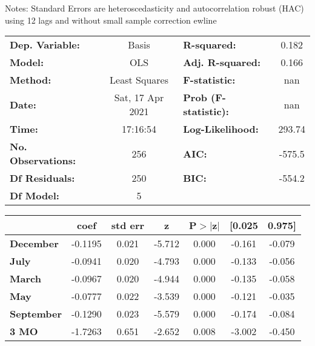 Notes: \newline
 [1] Standard Errors are heteroscedasticity and autocorrelation robust (HAC) using 12 lags and without small sample correction
ewline\begin{center}
\begin{tabular}{lclc}
\toprule
\textbf{Dep. Variable:}    &      Basis       & \textbf{  R-squared:         } &     0.182   \\
\textbf{Model:}            &       OLS        & \textbf{  Adj. R-squared:    } &     0.166   \\
\textbf{Method:}           &  Least Squares   & \textbf{  F-statistic:       } &       nan   \\
\textbf{Date:}             & Sat, 17 Apr 2021 & \textbf{  Prob (F-statistic):} &      nan    \\
\textbf{Time:}             &     17:16:54     & \textbf{  Log-Likelihood:    } &    293.74   \\
\textbf{No. Observations:} &         256      & \textbf{  AIC:               } &    -575.5   \\
\textbf{Df Residuals:}     &         250      & \textbf{  BIC:               } &    -554.2   \\
\textbf{Df Model:}         &           5      & \textbf{                     } &             \\
\bottomrule
\end{tabular}
\begin{tabular}{lcccccc}
                   & \textbf{coef} & \textbf{std err} & \textbf{z} & \textbf{P$> |$z$|$} & \textbf{[0.025} & \textbf{0.975]}  \\
\midrule
\textbf{December}  &      -0.1195  &        0.021     &    -5.712  &         0.000        &       -0.161    &       -0.079     \\
\textbf{July}      &      -0.0941  &        0.020     &    -4.793  &         0.000        &       -0.133    &       -0.056     \\
\textbf{March}     &      -0.0967  &        0.020     &    -4.944  &         0.000        &       -0.135    &       -0.058     \\
\textbf{May}       &      -0.0777  &        0.022     &    -3.539  &         0.000        &       -0.121    &       -0.035     \\
\textbf{September} &      -0.1290  &        0.023     &    -5.579  &         0.000        &       -0.174    &       -0.084     \\
\textbf{3 MO}      &      -1.7263  &        0.651     &    -2.652  &         0.008        &       -3.002    &       -0.450     \\

\end{tabular}
\end{center}
